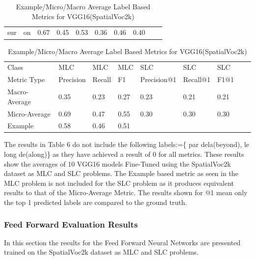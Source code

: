 \documentclass{csfyp}
\begin{document}
\begin{table}[!htbp]
\begin{tabular}{|l|l|l|l|l|l|l|l|l|l}
sur	&	on	&	0.67	&	0.45	&	0.53	&	0.36	&	0.46	&	0.40 \\ \cline{1-8}
\end{tabular}
\caption{VGG16(SpatialVoc2k) results for MLC and SLC}
\centering
\begin{tabular}{|l|l|l|l|l|l|l|l|l}
\cline{1-7}
Class &  MLC  &  MLC  &  MLC & SLC &  SLC & SLC \\ \cline{1-7}
Metric Type  & Precision &  Recall & F1 & Precision@1 & Recall@1 & F1@1 \\ \cline{1-7}
Macro-Average &	0.35	&	0.23	&	0.27	&	0.23	&	0.21	&	0.21 \\ \cline{1-7}
Micro-Average &	0.69	&	0.47	&	0.55	&	0.30	&	0.30	&	0.30 \\ \cline{1-7}
Example      &	0.58	&	0.46	&	0.51  \\ \cline{1-4}
\end{tabular}
\caption{Example/Micro/Macro Average Label Based Metrics for VGG16(SpatialVoc2k)}
The results in Table 6 do not include the following labels:=\{ par dela(beyond), le long de(along)\} as they have achieved a result of 0 for all metrics. These results show the averages of 10 VGG16 models Fine-Tuned using the SpatialVoc2k dataset as MLC and SLC problems. The Example based metric as seen in the MLC problem is not included for the SLC problem as it produces equivalent results to that of the Micro-Average Metric. The results shown for @1 mean only the top 1 predicted labels are compared to the ground truth.
\vspace{-4mm}
\end{table}

\subsubsection{Feed Forward Evaluation Results}
In this section the results for the Feed Forward Neural Networks are presented trained on the SpatialVoc2k dataset as MLC and SLC problems.
\end{document}
